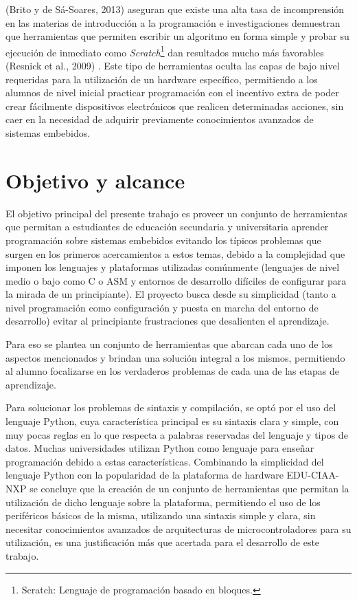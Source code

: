 (Brito y de Sá-Soares, 2013) \cite{papereducacion3} aseguran que existe una alta tasa de incomprensión en las materias de introducción a la programación e investigaciones demuestran que herramientas que permiten escribir un algoritmo en forma simple y probar su ejecución de inmediato como \textit{Scratch}\footnote{Scratch: Lenguaje de programación basado en bloques.} dan resultados mucho más favorables (Resnick et al., 2009) \cite{papereducacion4}. Este tipo de herramientas oculta las capas de bajo nivel requeridas para la utilización de un hardware específico, permitiendo a los alumnos de nivel inicial practicar programación con el incentivo extra de poder crear fácilmente dispositivos electrónicos que realicen determinadas acciones, sin caer en la necesidad de adquirir previamente conocimientos avanzados de sistemas embebidos.


\section{Objetivo y alcance}

El objetivo principal del presente trabajo es proveer un conjunto de herramientas que permitan a estudiantes de educación secundaria y universitaria aprender programación sobre sistemas embebidos evitando los típicos problemas que surgen en los primeros acercamientos a estos temas, debido a la complejidad que imponen los lenguajes y plataformas utilizadas comúnmente (lenguajes de nivel medio o bajo como C o ASM y entornos de desarrollo difíciles de configurar para la mirada de un principiante).
El proyecto busca desde su simplicidad (tanto a nivel programación como configuración y puesta en marcha del entorno de desarrollo) evitar al principiante frustraciones que desalienten el aprendizaje.

Para eso se plantea un conjunto de herramientas que abarcan cada uno de los aspectos mencionados y brindan una solución integral a los mismos, permitiendo al alumno focalizarse en los verdaderos problemas de cada una de las etapas de aprendizaje.
 
Para solucionar los problemas de sintaxis y compilación, se optó por el uso del lenguaje Python, cuya característica principal es su sintaxis clara y simple, con muy pocas reglas en lo que respecta a palabras reservadas del lenguaje y tipos de datos. Muchas universidades utilizan Python como lenguaje para enseñar programación debido a estas características\cite{papereducacion}. Combinando la simplicidad del lenguaje Python con la popularidad de la plataforma de hardware EDU-CIAA-NXP se concluye que la creación de un conjunto de herramientas que permitan la utilización de dicho lenguaje sobre la plataforma, permitiendo el uso de los periféricos básicos de la misma, utilizando una sintaxis simple y clara, sin necesitar conocimientos avanzados de arquitecturas de microcontroladores para su utilización, es una justificación más que acertada para el desarrollo de este trabajo.

